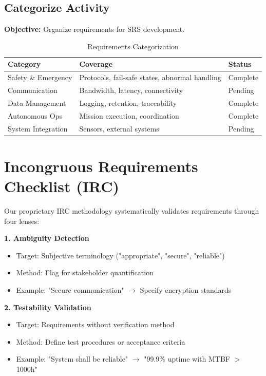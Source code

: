 \documentclass[12pt,a4paper]{article}
\begin{document}
\subsection{Categorize Activity}
\textbf{Objective:} Organize requirements for SRS development.

\begin{table}[H]
\centering
\small
\begin{tabular}{|p{}|p{}|p{}|}
\hline
\textbf{Category} & \textbf{Coverage} & \textbf{Status} \\
\hline
Safety \& Emergency & Protocols, fail-safe states, abnormal handling & Complete \\
\hline
Communication & Bandwidth, latency, connectivity & Pending \\
\hline
Data Management & Logging, retention, traceability & Complete \\
\hline
Autonomous Ops & Mission execution, coordination & Complete \\
\hline
System Integration & Sensors, external systems & Pending \\
\hline
\end{tabular}
\caption{Requirements Categorization}
\end{table}

\newpage

\section{Incongruous Requirements Checklist (IRC)}
\label{sec:irc}

Our proprietary IRC methodology systematically validates requirements through four lenses:

\textbf{1. Ambiguity Detection}
\begin{itemize}
\item Target: Subjective terminology ("appropriate", "secure", "reliable")
\item Method: Flag for stakeholder quantification
\item Example: "Secure communication" $\rightarrow$ Specify encryption standards
\end{itemize}

\textbf{2. Testability Validation}
\begin{itemize}
\item Target: Requirements without verification method
\item Method: Define test procedures or acceptance criteria
\item Example: "System shall be reliable" $\rightarrow$ "99.9\% uptime with MTBF $>$1000h"
\end{itemize}
\end{document}
